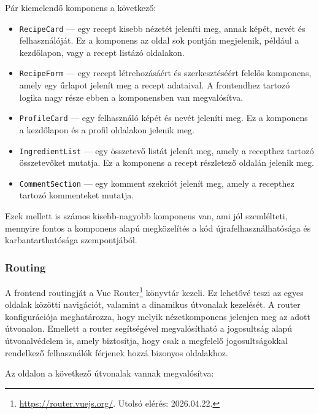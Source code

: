 Pár kiemelendő komponens a következő:
\begin{itemize}
    \item \texttt{RecipeCard} — egy recept kisebb nézetét jeleníti meg, annak képét, nevét és felhasználóját. Ez a komponens az oldal sok pontján megjelenik, például a kezdőlapon, vagy a recept listázó oldalakon.
    \item \texttt{RecipeForm} — egy recept létrehozásáért és szerkesztéséért felelős komponens, amely egy űrlapot jelenít meg a recept adataival. A frontendhez tartozó logika nagy része ebben a komponensben van megvalósítva.
    \item \texttt{ProfileCard} — egy felhasználó képét és nevét jeleníti meg. Ez a komponens a kezdőlapon és a profil oldalakon jelenik meg.
    \item \texttt{IngredientList} — egy összetevő listát jelenít meg, amely a recepthez tartozó összetevőket mutatja. Ez a komponens a recept részletező oldalán jelenik meg.
    \item \texttt{CommentSection} — egy komment szekciót jelenít meg, amely a recepthez tartozó kommenteket mutatja. 
\end{itemize}

Ezek mellett is számos kisebb-nagyobb komponens van, ami jól szemlélteti, mennyire
fontos a komponens alapú megközelítés a kód újrafelhasználhatósága és karbantarthatósága szempontjából.

\subsubsection{Routing}

A frontend routingját a Vue Router\footnote{\url{https://router.vuejs.org/}. Utolsó elérés: 2026.04.22.} könyvtár kezeli. Ez lehetővé teszi az egyes oldalak közötti navigációt, valamint a dinamikus útvonalak kezelését. A router konfigurációja meghatározza, hogy melyik nézetkomponens jelenjen meg az adott útvonalon. Emellett a router segítségével megvalósítható a jogosultság alapú útvonalvédelem is, amely biztosítja, hogy csak a megfelelő jogosultságokkal rendelkező felhasználók férjenek hozzá bizonyos oldalakhoz.

Az oldalon a következő útvonalak vannak megvalósítva:

